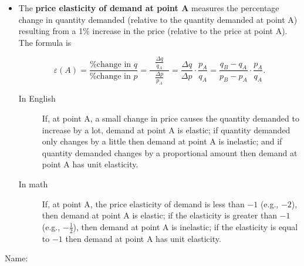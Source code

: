 \documentclass{article}
\begin{document}
\begin{EXAM}
\begin{itemize}
\item The \textbf{price elasticity of demand at point A} measures
the percentage change in quantity demanded (relative to the
quantity demanded at point A) resulting from a 1\% increase in the
price (relative to the price at point A). The formula is

\[
\varepsilon (A)=\frac{\mbox{\% change in } q}{\mbox{\% change in } p} = \displaystyle\frac{\ \ \ \displaystyle\frac{\Delta q}{q_A}\ \ \ }{\displaystyle\frac{\Delta p}{p_A}} =
\frac{\Delta q}{\Delta p}\cdot\frac{p_A}{q_A} =
\frac{q_B-q_A}{p_B-p_A}\cdot\frac{p_A}{q_A}.
\]

\enlargethispage{2\baselineskip}

\begin{description}

\item [In English] If, at point A, a small change in price causes
the quantity demanded to increase by a lot, demand at point A is
elastic; if quantity demanded only changes by a little then demand
at point A is inelastic; and if quantity demanded changes by a
proportional amount then demand at point A has unit elasticity.

\item [In math] If, at point A, the price elasticity of demand is
less than $-1$ (e.g., $-2$), then demand at point A is elastic; if
the elasticity is greater than $-1$ (e.g., $-\frac{1}{2}$), then
demand at point A is inelastic; if the elasticity is equal to $-1$
then demand at point A has unit elasticity.

\end{description}


\end{itemize}

\clearpage


\vspace*{-3cm}

\begin{flushright}
Name: \hspace*{1in}
\end{flushright}

\bigskip


\end{EXAM}
\end{document}
